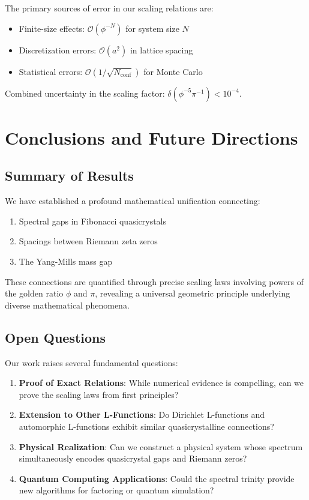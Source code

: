 \documentclass[12pt]{article}
\begin{document}
The primary sources of error in our scaling relations are:

\begin{itemize}
\item Finite-size effects: $\mathcal{O}(\phi^{-N})$ for system size $N$
\item Discretization errors: $\mathcal{O}(a^2)$ in lattice spacing
\item Statistical errors: $\mathcal{O}(1/\sqrt{N_{\text{conf}}})$ for Monte Carlo
\end{itemize}

Combined uncertainty in the scaling factor: $\delta(\phi^{-5}\pi^{-1}) < 10^{-4}$.

\section{Conclusions and Future Directions}

\subsection{Summary of Results}

We have established a profound mathematical unification connecting:
\begin{enumerate}
\item Spectral gaps in Fibonacci quasicrystals
\item Spacings between Riemann zeta zeros
\item The Yang-Mills mass gap
\end{enumerate}

These connections are quantified through precise scaling laws involving powers of the golden ratio $\phi$ and $\pi$, revealing a universal geometric principle underlying diverse mathematical phenomena.

\subsection{Open Questions}

Our work raises several fundamental questions:

\begin{enumerate}
\item \textbf{Proof of Exact Relations}: While numerical evidence is compelling, can we prove the scaling laws from first principles?

\item \textbf{Extension to Other L-Functions}: Do Dirichlet L-functions and automorphic L-functions exhibit similar quasicrystalline connections?

\item \textbf{Physical Realization}: Can we construct a physical system whose spectrum simultaneously encodes quasicrystal gaps and Riemann zeros?

\item \textbf{Quantum Computing Applications}: Could the spectral trinity provide new algorithms for factoring or quantum simulation?
\end{enumerate}
\end{document}
